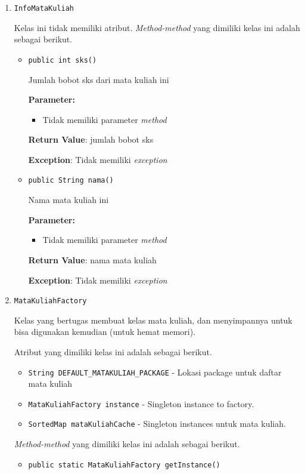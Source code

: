 \documentclass{article}
\begin{document}
\begin{enumerate}
\item \texttt{InfoMataKuliah}



Kelas ini tidak memiliki atribut. \textit{Method-method} yang dimiliki kelas ini adalah sebagai berikut.
\begin{itemize}
\item \texttt{public int sks()}

Jumlah bobot sks dari mata kuliah ini

\textbf{Parameter:}
\begin{itemize}
\item Tidak memiliki parameter \textit{method}
\end{itemize}
\textbf{Return Value}: jumlah bobot sks

\textbf{Exception}: Tidak memiliki \textit{exception}

\item \texttt{public String nama()}

Nama mata kuliah ini

\textbf{Parameter:}
\begin{itemize}
\item Tidak memiliki parameter \textit{method}
\end{itemize}
\textbf{Return Value}: nama mata kuliah

\textbf{Exception}: Tidak memiliki \textit{exception}

\end{itemize}
\item \texttt{MataKuliahFactory}

Kelas yang bertugas membuat kelas mata kuliah, dan menyimpannya untuk bisa
 digunakan kemudian (untuk hemat memori).

Atribut yang dimiliki kelas ini adalah sebagai berikut.
\begin{itemize}
\item \texttt{String DEFAULT\_MATAKULIAH\_PACKAGE} - Lokasi package untuk daftar mata kuliah
\item \texttt{MataKuliahFactory instance} - Singleton instance to factory.
\item \texttt{SortedMap mataKuliahCache} - Singleton instances untuk mata kuliah.
\end{itemize}
\textit{Method-method} yang dimiliki kelas ini adalah sebagai berikut.
\begin{itemize}
\item \texttt{public static MataKuliahFactory getInstance()}




\end{itemize}
\end{enumerate}
\end{document}
